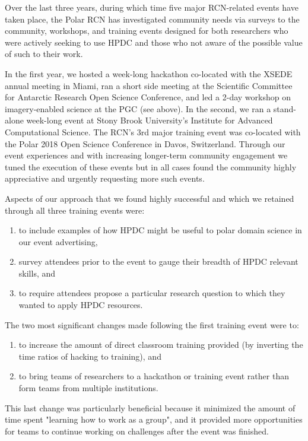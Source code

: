 \documentclass[10pt,letterpaper,draft]{article}
\begin{document}
Over the last three years, during which time five major RCN-related events have taken place, the Polar RCN has investigated community needs via surveys to the community, workshops, and training events designed for both researchers who were actively seeking to use HPDC and those who not aware of the possible value of such to their work.

In the first year, we hosted a week-long hackathon co-located with the XSEDE annual meeting in Miami, ran a short side meeting at the Scientific Committee for Antarctic Research Open Science Conference, and led a 2-day workshop on imagery-enabled science at the PGC (see above). In the second, we ran a stand-alone week-long event at Stony Brook University's Institute for Advanced Computational Science. The RCN's 3rd major training event was co-located with the Polar 2018 Open Science Conference in Davos, Switzerland. Through our event experiences and with increasing longer-term community engagement we tuned the execution of these events but in all cases found the community highly appreciative and urgently requesting more such events.

Aspects of our approach that we found highly successful and which we retained through all three training events were:

\begin{enumerate}
    \item to include examples of how HPDC might be useful to polar domain science in our event advertising,
\item survey attendees prior to the event to gauge their breadth of HPDC relevant skills, and
\item to require attendees propose a particular research question to which they wanted to apply HPDC resources.
\end{enumerate}

The two most significant changes made following the first training event were to:
\begin{enumerate}
    \item to increase the amount of direct classroom training provided (by inverting the time ratios of hacking to training), and
\item to bring teams of researchers to a hackathon or training event rather than form teams from multiple institutions.
\end{enumerate}

This last change was particularly beneficial because it minimized the amount of time spent "learning how to work as a group", and it provided more opportunities for teams to continue working on challenges after the event was finished.
\end{document}
